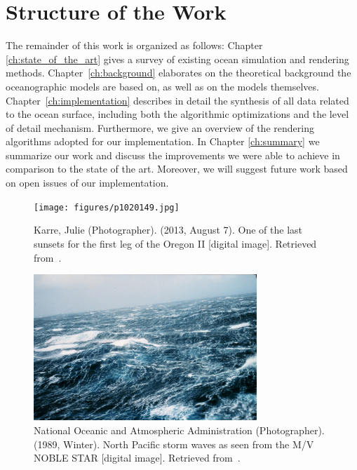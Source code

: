 \section{Structure of the Work}
\label{sec:structure}
The remainder of this work is organized as follows: Chapter
\ref{ch:state_of_the_art} gives a survey of existing ocean simulation and
rendering methods. Chapter~\ref{ch:background} elaborates on the theoretical
background the oceanographic models are based on, as well as on the models
themselves. Chapter~\ref{ch:implementation} describes in detail the
synthesis of all data related to the ocean surface, including both the algorithmic
optimizations and the level of detail mechanism. Furthermore, we give an overview
of the rendering algorithms adopted for our implementation. In Chapter
\ref{ch:summary} we summarize our work and discuss the improvements we were able
to achieve in comparison to the state of the art. Moreover, we will suggest
future work based on open issues of our implementation.
%
%
\begin{figure}
\centering
\texttt{[image: figures/p1020149.jpg]}
\caption{
	Karre, Julie (Photographer).
	(2013, August 7).
	One of the last sunsets for the first leg of the Oregon II [digital image].
	Retrieved from~\citet{misc:noaa:sunset}.
	}
\label{fig:ocean:sunset}
\end{figure}
\begin{figure}
\centering
\includegraphics[width=0.75\textwidth]{figures/wea00816.jpg}
\caption{
	National Oceanic and Atmospheric Administration (Photographer).
	(1989, Winter).
	North Pacific storm waves as seen from the M/V NOBLE STAR [digital image].
	Retrieved from~\citet{misc:noaa:storm}.
	}
\label{fig:ocean:storm}
\end{figure}
